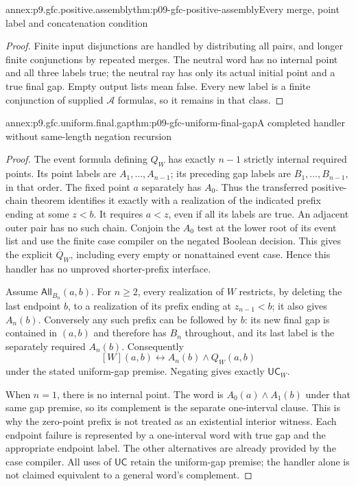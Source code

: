 \begin{annexitem}{annex:p9.gfc.positive.assembly}{thm:p09-gfc-positive-assembly}{Every merge, point label and concatenation condition}
\begin{proof}
Finite input disjunctions are handled by distributing all
pairs, and longer finite conjunctions by repeated merges.
The neutral word has no internal point and all three
labels true; the neutral ray has only its actual initial
point and a true final gap. Empty output lists mean false.
Every new label is a finite conjunction of supplied
\(\mathcal A\) formulas, so it remains in that class.
\end{proof}
\end{annexitem}

\begin{annexitem}{annex:p9.gfc.uniform.final.gap}{thm:p09-gfc-uniform-final-gap}{A completed handler without same-length negation recursion}
\begin{proof}
The event formula defining \(Q_W\) has exactly
\(n-1\) strictly internal required points. Its point
labels are \(A_1,\ldots,A_{n-1}\); its preceding
gap labels are \(B_1,\ldots,B_{n-1}\), in that
order. The fixed point \(a\) separately has
\(A_0\). Thus the transferred positive-chain
theorem identifies it exactly with a realization
of the indicated prefix ending at some \(z<b\).
It requires \(a<z\), even if all its labels are
true. An adjacent outer pair has no such chain.
Conjoin the \(A_0\) test at the lower root of
its event list and use the finite case compiler
on the negated Boolean decision. This gives the
explicit \(\overline Q_W\), including every
empty or nonattained event case. Hence this
handler has no unproved shorter-prefix interface.

Assume \(\mathsf{All}_{B_n}(a,b)\). For \(n\geq2\),
every realization of \(W\) restricts, by deleting
the last endpoint \(b\), to a realization of
its prefix ending at \(z_{n-1}<b\); it also
gives \(A_n(b)\). Conversely any such prefix
can be followed by \(b\): its new final gap
is contained in \((a,b)\) and therefore has
\(B_n\) throughout, and its last label is
the separately required \(A_n(b)\).
Consequently
\[
               [W](a,b)\longleftrightarrow A_n(b)\land Q_W(a,b)
\]
under the stated uniform-gap premise. Negating
gives exactly \(\mathsf{UC}_W\).

When \(n=1\), there is no internal point.
The word is \(A_0(a)\land A_1(b)\) under
that same gap premise, so its complement is
the separate one-interval clause. This is why
the zero-point prefix is not treated as an
existential interior witness. Each endpoint
failure is represented by a one-interval word
with true gap and the appropriate endpoint
label. The other alternatives are already
provided by the case compiler. All uses of
\(\mathsf{UC}\) retain the uniform-gap premise;
the handler alone is not claimed equivalent
to a general word's complement.
\end{proof}
\end{annexitem}

